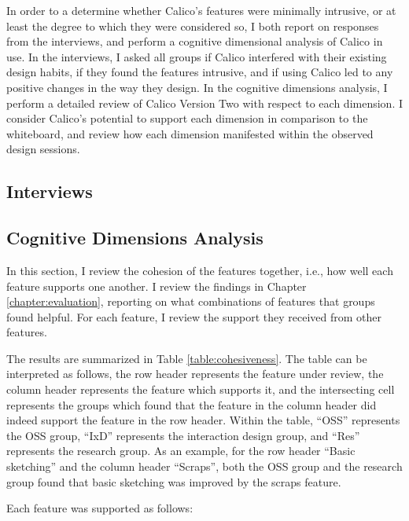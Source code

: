 In order to a determine whether Calico's features were minimally intrusive, or at least the degree to which they were considered so, I both report on responses from the interviews, and perform a cognitive dimensional analysis of Calico in use. In the interviews, I asked all groups if Calico interfered with their existing design habits, if they found the features intrusive, and if using Calico led to any positive changes in the way they design. In the cognitive dimensions analysis, I perform a detailed review of Calico Version Two with respect to each dimension. I consider Calico's potential to support each dimension in comparison to the whiteboard, and review how each dimension manifested within the observed design sessions.

\subsection{Interviews}





\subsection{Cognitive Dimensions Analysis}
\label{chapter:discussion:cohesive-features}

In this section, I review the cohesion of the features together, i.e., how well each feature supports one another. I review the findings in Chapter \ref{chapter:evaluation}, reporting on what combinations of features that groups found helpful. For each feature, I review the support they received from other features. 

The results are summarized in Table \ref{table:cohesiveness}. The table can be interpreted as follows, the row header represents the feature under review, the column header represents the feature which supports it, and the intersecting cell represents the groups which found that the feature in the column header did indeed support the feature in the row header. Within the table, ``OSS'' represents the OSS group, ``IxD'' represents the interaction design group, and ``Res'' represents the research group. As an example, for the row header ``Basic sketching'' and the column header ``Scraps'', both the OSS group and the research group found that basic sketching was improved by the scraps feature. 

Each feature was supported as follows:

